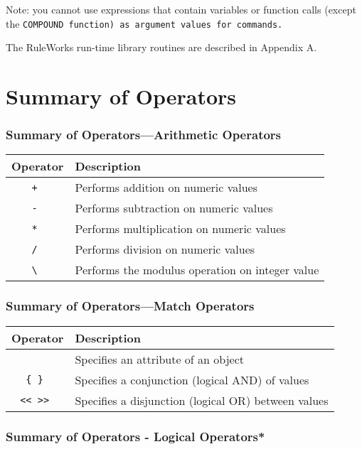 Note: you cannot use expressions that contain variables or function
calls (except the \tt{COMPOUND} function) as argument values for
commands.

The RuleWorks run-time library routines are described in Appendix A.

\section{Summary of Operators}

\subsubsection{Summary of Operators---Arithmetic Operators}

  \begin{tabularx}{\columnwidth}{cX}
    \toprule
    Operator & Description \\
    \midrule
    \tt{+} & Performs addition on numeric values \\
    \tt{-} & Performs subtraction on numeric values \\
    \tt{*} & Performs multiplication on numeric values \\
    \tt{/} & Performs division on numeric values \\
    \tt{\textbackslash} & Performs the modulus operation on integer value \\
    \bottomrule
 \end{tabularx}

\subsubsection{Summary of Operators---Match Operators}

\begin{tabularx}{\columnwidth}{cX}
  \toprule
  Operator & Description \\
  \midrule
  \ct & Specifies an attribute of an object \\
  \tt{\{} \tt{\}} & Specifies a conjunction (logical AND) of values \\
  \tt{<<} \tt{>>} & Specifies a disjunction (logical OR)
                    between values \\
  \bottomrule
\end{tabularx}
  
\subsubsection{Summary of Operators - Logical Operators*}

